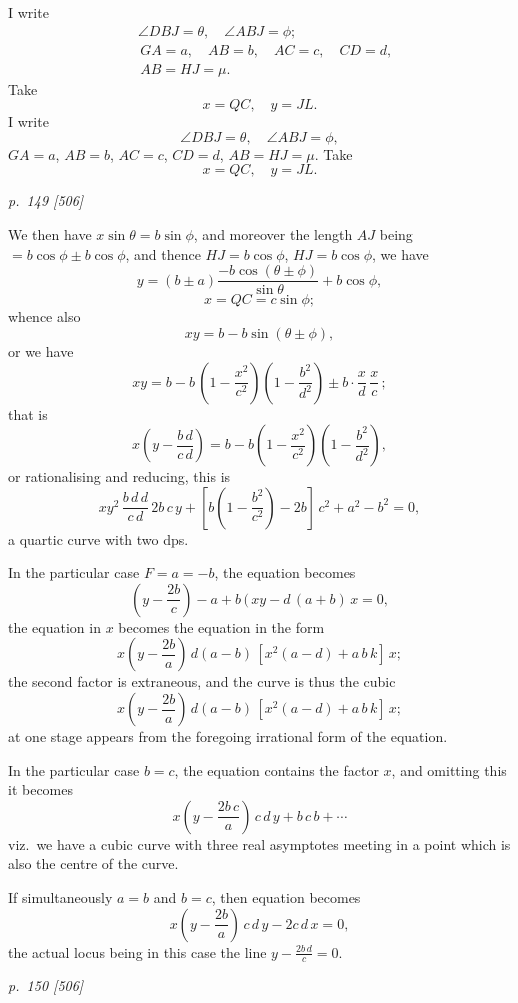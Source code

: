 \documentclass[11pt,a4paper]{book}
\begin{document}
I write
\begin{align*}
&{\angle DBJ = \theta},\quad {\angle ABJ = \phi};\\
&\,GA = a,\quad AB = b,\quad AC = c,\quad CD = d,\\
&\,AB = HJ = \mu.
\end{align*}
Take
\[
x = QC,\quad y = JL.
\]
I write
\[
{\angle DBJ = \theta},\quad {\angle ABJ = \phi},
\]
$G A = a$, $A B = b$, $A C = c$, $C D = d$,
$A B = H J = \mu.$
Take
\[
x = Q C,\quad y = J L.
\]

\clearpage

\bigskip
\textit{p.~149 [506]}
\smallskip

\noindent
We then have $x \sin\theta = b \sin\phi$, and moreover the length $A J$ being $= b \cos\phi \pm b \cos\phi$,
and thence $H J = b \cos\phi$, $H J = b \cos\phi$, we have
\[
y = (b \pm a) \frac{- b \cos(\theta \pm \phi)}{\sin\theta} + b \cos\phi,
\]
\[
x = QC = c\sin\phi;
\]
whence also
\[
x y = b - b\sin(\theta \pm \phi),
\]
or we have
\[
x y = b - b\,(1 - \frac{x^2}{c^2}) (1 - \frac{b^2}{d^2}) \pm b \cdot \frac{x}{d}\,\frac{x}{c}\,;
\]
that is
\[
x\left(y - \frac{b\,d}{c\,d}\right) = b - b\left(1 - \frac{x^2}{c^2}\right) (1 - \frac{b^2}{d^2}),
\]
or rationalising and reducing, this is
\[
x y^2\,\frac{b\,d\,d}{c\,d}\,2b\,c\,y + \left[b\left(1 - \frac{b^2}{c^2}\right) - 2b\right]\,c^2 + a^2 - b^2 = 0,
\]
a quartic curve with two dps.

In the particular case $F = a = -b$, the equation becomes
\[
\left(y - \frac{2b}{c}\right) - a + b\,(\,xy - d\,(a + b)\,x = 0,
\]
the equation in $x$ becomes the equation in the form
\[
x\left(y - \frac{2b}{a}\right)\,d(a - b)\,[x^2(a - d) + a\,b\,k]\,x;
\]
the second factor is extraneous, and the curve is thus the cubic
\[
x\left(y - \frac{2b}{a}\right)\,d(a - b)\,[x^2(a - d) + a\,b\,k]\,x;
\]
at one stage appears from the foregoing irrational form of the equation.

In the particular case $b = c$, the equation contains the factor $x$, and omitting this
it becomes
\[
x\left(y - \frac{2b\,c}{a}\right)\,c\,d\,y + b\,c\,b + \cdots
\]
viz.\ we have a cubic curve with three real asymptotes meeting in a point which
is also the centre of the curve.

If simultaneously $a = b$ and $b = c$, then equation becomes
\[
x\left(y - \frac{2b}{a}\right)\,c\,d\,y - 2c\,d\,x = 0,
\]
the actual locus being in this case the line $y - \frac{2b\,d}{c} = 0$.

\clearpage

\bigskip
\textit{p.~150 [506]}
\smallskip
\end{document}
